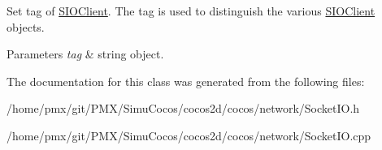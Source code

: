Set tag of \hyperlink{classnetwork_1_1SIOClient}{S\+I\+O\+Client}. The tag is used to distinguish the various \hyperlink{classnetwork_1_1SIOClient}{S\+I\+O\+Client} objects. 
\begin{DoxyParams}{Parameters}
{\em tag} & string object. \\
\hline
\end{DoxyParams}


The documentation for this class was generated from the following files\+:\begin{DoxyCompactItemize}
\item 
/home/pmx/git/\+P\+M\+X/\+Simu\+Cocos/cocos2d/cocos/network/Socket\+I\+O.\+h\item 
/home/pmx/git/\+P\+M\+X/\+Simu\+Cocos/cocos2d/cocos/network/Socket\+I\+O.\+cpp\end{DoxyCompactItemize}
